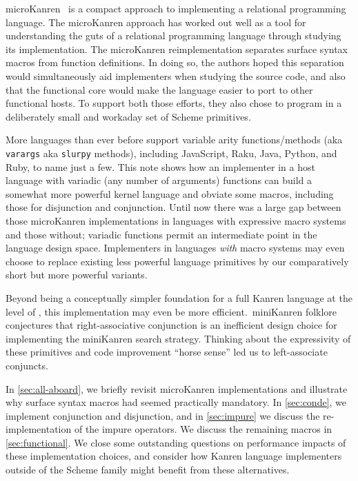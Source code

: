 \documentclass[sigplan,draft,balance,pbalance,natbib=false]{acmart}
\begin{document}
microKanren~\cite{hemann2013muKanren} is a compact approach to
implementing a relational programming language. The microKanren
approach has worked out well as a tool for understanding the guts of a
relational programming language through studying its implementation.
The microKanren reimplementation separates surface syntax macros from
function definitions. In doing so, the authors hoped this separation
would simultaneously aid implementers when studying the source code,
and also that the functional core would make the language easier to
port to other functional hosts. To support both those efforts, they
also chose to program in a deliberately small and workaday set of
Scheme primitives.

More languages than ever before support variable arity
functions/methods (aka \verb|varargs| aka \verb|slurpy| methods),
including JavaScript, Raku, Java, Python, and Ruby, to name just a
few. This note shows how an implementer in a host language with
variadic (any number of arguments) functions can build a somewhat more
powerful kernel language and obviate some macros, including those for
disjunction and conjunction. Until now there was a large gap between
those microKanren implementations in languages with expressive macro
systems and those without; variadic functions permit an intermediate
point in the language design space. Implementers in languages
\emph{with} macro systems may even choose to replace existing less
powerful language primitives by our comparatively short but more
powerful variants.

Beyond being a conceptually simpler foundation for a full Kanren
language at the level of , this
implementation may even be more efficient.\ miniKanren folklore
conjectures that right-associative conjunction is an inefficient
design choice for implementing the miniKanren search strategy.
Thinking about the expressivity of these primitives and code
improvement \enquote{horse sense} led us to left-associate conjuncts.

In \cref{sec:all-aboard}, we briefly revisit microKanren
implementations and illustrate why surface syntax macros had seemed
practically mandatory. In \cref{sec:conde}, we implement conjunction
and disjunction, and in \cref{sec:impure} we discuss the
re-implementation of the impure operators. We discuss the remaining
macros in \cref{sec:functional}. We close some outstanding questions
on performance impacts of these implementation choices, and consider
how Kanren language implementers outside of the Scheme family might
benefit from these alternatives.
\end{document}
